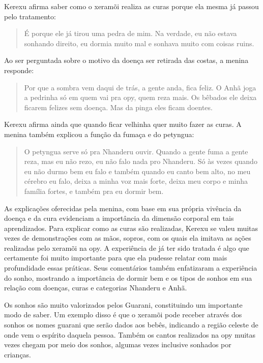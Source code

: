 Kerexu afirma saber como o xeramõi realiza as curas porque ela mesma já
passou pelo tratamento:

\begin{quotation}
É porque ele já tirou uma pedra de mim. Na verdade, eu não estava
sonhando direito, eu dormia muito mal e sonhava muito com coisas ruins.
\end{quotation}

Ao ser perguntada sobre o motivo da doença ser retirada das costas, a
menina responde:

\begin{quotation}
Por que a sombra vem daqui de trás, a gente anda, fica feliz. O Anhã
joga a pedrinha só em quem vai pra opy, quem reza mais. Os bêbados ele
deixa ficarem felizes sem doença. Mas da pinga eles ficam doentes.
\end{quotation}

Kerexu afirma ainda que quando ficar velhinha quer muito fazer as curas.
A menina também explicou a função da fumaça e do petyngua:

\begin{quotation}
O petyngua serve só pra Nhanderu ouvir. Quando a gente fuma a gente
reza, mas eu não rezo, eu não falo nada pro Nhanderu. Só às vezes
quando eu não durmo bem eu falo e também quando eu canto bem alto, no
meu cérebro eu falo, deixa a minha voz mais forte, deixa meu corpo e
minha família fortes, e também pra eu dormir bem.
\end{quotation}

As explicações oferecidas pela menina, com base em sua própria vivência
da doença e da cura evidenciam a importância da dimensão corporal em
tais aprendizados. Para explicar como as curas são realizadas, Kerexu
se valeu muitas vezes de demonstrações com as mãos, sopros, com os
quais ela imitava as ações realizadas pelo xeramõi na opy. A
experiência de já ter sido tratada é algo que certamente foi muito
importante para que ela pudesse relatar com mais profundidade essas
práticas. Seus comentários também enfatizaram a experiência do sonho,
mostrando a importância de dormir bem e os tipos de sonhos em sua
relação com doenças, curas e categorias Nhanderu e Anhã.

Os sonhos são muito valorizados pelos Guarani, constituindo um
importante modo de saber. Um exemplo disso é que o xeramõi pode receber
através dos sonhos os nomes guarani que serão dados aos bebês,
indicando a região celeste de onde vem o espírito daquela pessoa.
Também os cantos realizados na opy muitas vezes chegam por meio dos
sonhos, algumas vezes inclusive sonhados por crianças.

